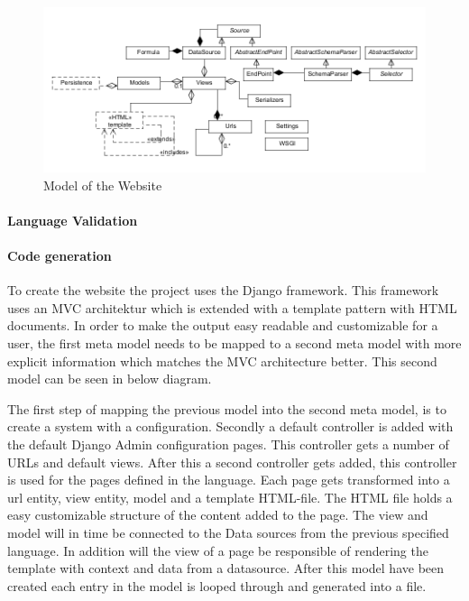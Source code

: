 \begin{figure}
\begin{center}
\includegraphics[width=\linewidth]{images/websitemodel}
\end{center}
\caption{Model of the Website}
\label{fig:websitemodel}
\end{figure}

\paragraph{Language Validation}

\paragraph{Code generation}
To create the website the project uses the Django framework. 
This framework uses an MVC architektur which is extended with a template pattern with HTML documents. 
In order to make the output easy readable and customizable for a user, the first meta model needs to be mapped to a second meta model with more explicit information which matches the MVC architecture better.
This second model can be seen in below diagram. 



The first step of mapping the previous model into the second meta model, is to create a system with a configuration. 
Secondly a default controller is added with the default Django Admin configuration pages. 
This controller gets a number of URLs and default views. 
After this a second controller gets added, this controller is used for the pages defined in the language. 
Each page gets transformed into a url entity, view entity, model and a template HTML-file.
The HTML file holds a easy customizable structure of the content added to the page. The view and model will in time be connected to the Data sources from the previous specified language. 
In addition will the view of a page be responsible of rendering the template with context and data from a datasource. 
After this model have been created each entry in the model is looped through and generated into a file.


